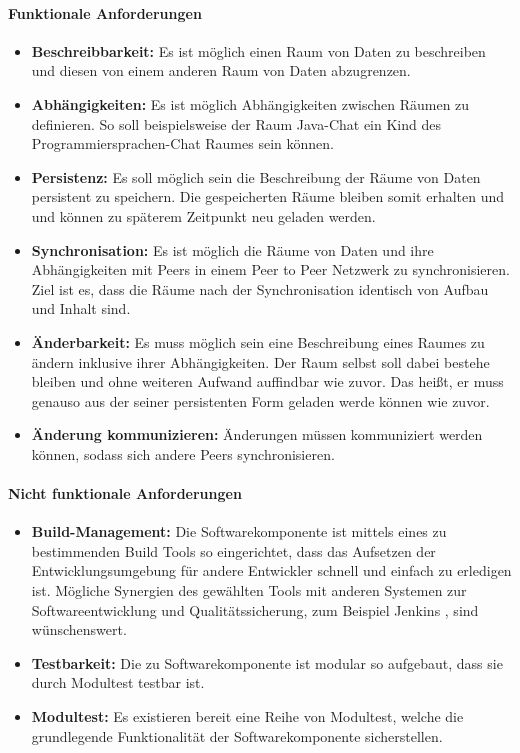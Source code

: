 \documentclass[a4paper]{article}
\begin{document}
	\paragraph{Funktionale Anforderungen}
	\begin{itemize}
		\item \textbf{Beschreibbarkeit:} Es ist möglich einen Raum von
		Daten zu beschreiben und diesen von einem anderen Raum
		von Daten abzugrenzen. 
		\item \textbf{Abhängigkeiten:} Es ist möglich Abhängigkeiten zwischen
		Räumen zu definieren. So soll beispielsweise der Raum Java-Chat ein 
		Kind des Programmiersprachen-Chat Raumes sein können.
		\item \textbf{Persistenz:} Es soll möglich sein die Beschreibung der
		Räume von Daten persistent zu speichern. Die gespeicherten Räume
		bleiben somit erhalten und und können zu späterem Zeitpunkt neu
		geladen werden.
		\item \textbf{Synchronisation:} Es ist möglich die Räume von Daten 
		und ihre Abhängigkeiten mit Peers in einem Peer to Peer Netzwerk 
		zu synchronisieren. Ziel ist es, dass die Räume nach der 
		Synchronisation identisch von Aufbau und Inhalt sind.
		\item \textbf{Änderbarkeit:} Es muss möglich sein eine Beschreibung
		eines Raumes zu ändern inklusive ihrer Abhängigkeiten. Der Raum
		selbst soll dabei bestehe bleiben und ohne weiteren Aufwand auffindbar 
		wie	zuvor. Das heißt, er muss genauso aus der seiner persistenten Form 
		geladen werde können wie zuvor.
		\item \textbf{Änderung kommunizieren:} Änderungen müssen
		kommuniziert werden können, sodass sich andere Peers synchronisieren.
	\end{itemize} 	
	
	\paragraph{Nicht funktionale Anforderungen}
	\begin{itemize}
		\item \textbf{Build-Management:} Die Softwarekomponente ist mittels
		eines zu bestimmenden Build Tools so eingerichtet, dass das Aufsetzen 
		der	Entwicklungsumgebung für andere Entwickler schnell und einfach
		zu erledigen ist. Mögliche Synergien des gewählten Tools mit anderen
		Systemen zur Softwareentwicklung und Qualitätssicherung, zum Beispiel  
		Jenkins \cite{Jenkins}, sind wünschenswert.
		\item \textbf{Testbarkeit:} Die zu Softwarekomponente
		ist modular so aufgebaut, dass sie durch Modultest testbar ist.
		\item \textbf{Modultest:} Es existieren bereit eine Reihe von
		Modultest, welche die grundlegende Funktionalität der 
		Softwarekomponente sicherstellen.
	\end{itemize} 
	
\end{document}
